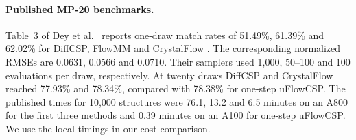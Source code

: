 \paragraph{Published MP-20 benchmarks.}
Table~3 of Dey et al.\ \cite{uflow} reports one-draw match rates of 51.49\%, 61.39\% and 62.02\% for DiffCSP, FlowMM and CrystalFlow \cite{diffcsp,flowmm,crystalflow}. The corresponding normalized RMSEs are 0.0631, 0.0566 and 0.0710. Their samplers used 1,000, 50--100 and 100 evaluations per draw, respectively. At twenty draws DiffCSP and CrystalFlow reached 77.93\% and 78.34\%, compared with 78.38\% for one-step uFlowCSP. The published times for 10,000 structures were 76.1, 13.2 and 6.5 minutes on an A800 for the first three methods and 0.39 minutes on an A100 for one-step uFlowCSP. We use the local timings in our cost comparison.
